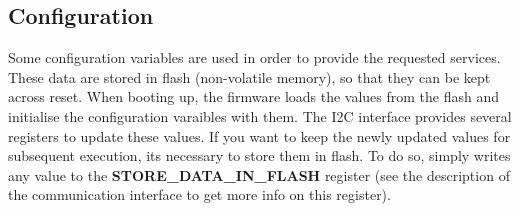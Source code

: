 \subsection*{Configuration}

Some configuration variables are used in order to provide the requested services. These data are stored in flash (non-\/volatile memory), so that they can be kept across reset. When booting up, the firmware loads the values from the flash and initialise the configuration varaibles with them. The I2C interface provides several registers to update these values. If you want to keep the newly updated values for subsequent execution, it\textquotesingle{}s necessary to store them in flash. To do so, simply writes any value to the {\bfseries S\+T\+O\+R\+E\+\_\+\+D\+A\+T\+A\+\_\+\+I\+N\+\_\+\+F\+L\+A\+SH} register (see the description of the communication interface to get more info on this register). 